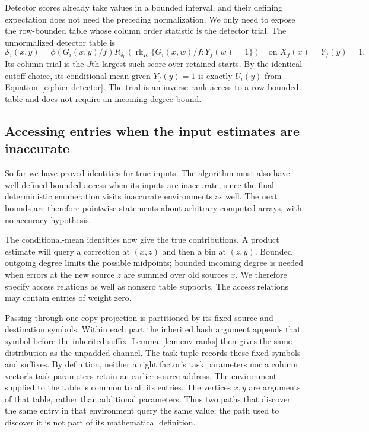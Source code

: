 Detector scores already take values in a bounded interval, and their defining expectation does not need the preceding normalization. We only need to expose the row-bounded table whose column order statistic is the detector trial. The unnormalized detector table is
\begin{equation}
 \mathcal S_i(x,y)=\phi(G_i(x,y)/f)
 R_{\delta_0}\!\left(\operatorname{rk}_K
       \{G_i(x,w)/f:Y_f(w)=1\}\right)
 \quad\text{on }X_f(x)=Y_f(y)=1.
 \label{eq:atom-detector-table}
\end{equation}
Its column trial is the $J$th largest such score over retained starts.
By the identical cutoff choice, its conditional mean given $Y_f(y)=1$
is exactly $U_i(y)$ from Equation~\eqref{eq:hier-detector}.
The trial is an inverse rank access to a row-bounded table and does not
require an incoming degree bound.

\subsection{Accessing entries when the input estimates are inaccurate}

So far we have proved identities for true inputs. The algorithm must also have well-defined bounded access when its inputs are inaccurate, since the final deterministic enumeration visits inaccurate environments as well. The next bounds are therefore pointwise statements about arbitrary computed arrays, with no accuracy hypothesis.

The conditional-mean identities now give the true contributions.  A
product estimate will query a correction at $(x,z)$ and then a bin at
$(z,y)$.  Bounded outgoing degree limits the possible midpoints; bounded
incoming degree is needed when errors at the new source $z$ are summed
over old sources $x$.  We therefore specify access relations as well as
nonzero table supports.  The access relations may contain entries of
weight zero.

Passing through one copy projection is partitioned by its fixed source and
destination symbols.  Within each part the inherited hash argument
appends that symbol before the inherited suffix.  Lemma~\ref{lem:env-ranks}
then gives the same distribution as the unpadded channel.  The task tuple
records these fixed symbols and suffixes.  By definition, neither a right
factor's task parameters nor a column vector's task parameters retain an
earlier source address.
The environment supplied to the table is common to all its entries.
The vertices $x,y$ are arguments of that table, rather than additional
parameters.  Thus two paths that discover the same entry in that
environment query the same value; the path used to discover it is not
part of its mathematical definition.

